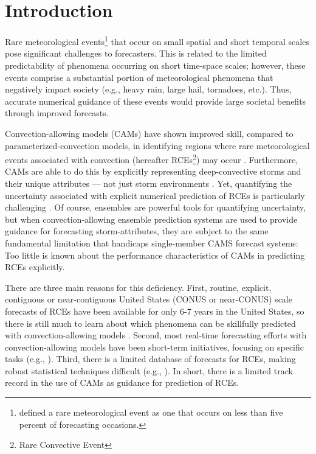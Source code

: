 

\chapter{Introduction}
\label{intro}

Rare meteorological events\footnote{\cite{Murphy1991} defined a rare meteorological event as one that occurs on less than five percent of forecasting occasions.} that occur on small spatial and short temporal scales pose significant challenges to forecasters. This is related to the limited predictability of phenomena occurring on short time-space scales; however, these events comprise a substantial portion of meteorological phenomena that negatively impact society (e.g., heavy rain, large hail, tornadoes, etc.). Thus, accurate numerical guidance of these events would provide large societal benefits through improved forecasts.

Convection-allowing models (CAMs) have shown improved skill, compared to parameterized-convection models, in identifying regions where rare meteorological events associated with convection (hereafter RCEs\footnote{Rare Convective Event}) may occur \citep{Clark2010a}. Furthermore, CAMs are able to do this by explicitly representing deep-convective storms and their unique attributes --- not just storm environments \citep{Kain2010}. Yet, quantifying the uncertainty associated with explicit numerical prediction of RCEs is particularly challenging \citep{Sobash2011}. Of course, ensembles are powerful tools for quantifying uncertainty, but when convection-allowing ensemble prediction systems are used to provide guidance for forecasting storm-attributes, they are subject to the same fundamental limitation that handicaps single-member CAMS forecast systems: Too little is known about the performance characteristics of CAMs in predicting RCEs explicitly.

There are three main reasons for this deficiency. First, routine, explicit, contiguous  or near-contiguous United States (CONUS or near-CONUS) scale forecasts of RCEs have been available for only 6-7 years in the United States, so there is still much to learn about which phenomena can be skillfully predicted with convection-allowing models \citep{Kain2008, Kain2010}. Second, most real-time forecasting efforts with convection-allowing models have been short-term initiatives, focusing on specific tasks (e.g., \citealp{Done2004, Weisman2008}). Third, there is a limited database of forecasts for RCEs, making robust statistical techniques difficult (e.g., \citealp{Hamill2006}). In short, there is a limited track record in the use of CAMs as guidance for prediction of RCEs.

